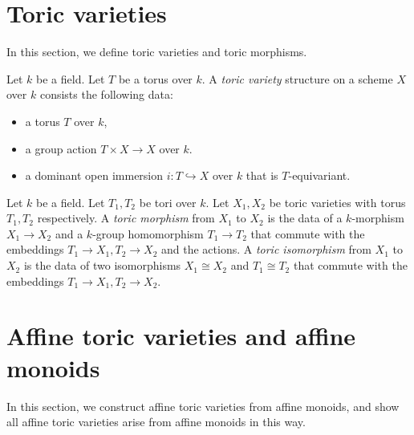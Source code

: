 \section{Toric varieties}


In this section, we define toric varieties and toric morphisms.


\begin{definition}
  \label{5-1-tor-var}
  \leanok

  Let $k$ be a field.
  Let $T$ be a torus over $k$.
  A \emph{toric variety} structure on a scheme $X$ over $k$ consists the following data:
  \begin{itemize}
    \item a torus $T$ over $k$,
    \item a group action $T \times X \to X$ over $k$.
    \item a dominant open immersion $i : T \hookrightarrow X$ over $k$ that is $T$-equivariant.
  \end{itemize}
\end{definition}


\begin{definition}
  \label{5-1-tor-hom}
  \leanok

  Let $k$ be a field.
  Let $T_1, T_2$ be tori over $k$.
  Let $X_1, X_2$ be toric varieties with torus $T_1, T_2$ respectively.
  A \emph{toric morphism} from $X_1$ to $X_2$ is the data of a $k$-morphism $X_1 \to X_2$
  and a $k$-group homomorphism $T_1 \to T_2$ that commute
  with the embeddings $T_1 \to X_1, T_2 \to X_2$ and the actions.
  A \emph{toric isomorphism} from $X_1$ to $X_2$ is the data of two isomorphisms $X_1 \cong X_2$ and
  $T_1 \cong T_2$ that commute with the embeddings $T_1 \to X_1, T_2 \to X_2$.
\end{definition}


\section{Affine toric varieties and affine monoids}\label{sec:aff-tor-var}


In this section, we construct affine toric varieties from affine monoids,
and show all affine toric varieties arise from affine monoids in this way.


